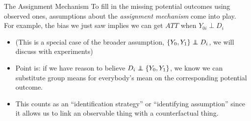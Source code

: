 \documentclass[xcolor=dvipsnames]{beamer}
\newcommand\indep{\protect\mathpalette{\protect\independenT}{\perp}}
\def\independenT#1#2{\mathrel{\rlap{$#1#2$}\mkern2mu{#1#2}}}
\begin{document}
\begin{frame}{The Assignment Mechanism}
\small
{} To fill in the missing potential outcomes using observed ones, assumptions about the \textit{assignment mechanism} come into play.  \\
\bigskip
{} For example, the bias we just saw implies we can get $ATT$ when $Y_{0i} \perp D_i$ 
\begin{itemize}
\footnotesize
\item (This is a special case of the broader assumption, $\{Y_0, Y_1 \} \indep D_i$, we will discuss with experiments)
\item Point is: if we have reason to believe $D_i \indep \{Y_0, Y_1 \}$, we know we can substitute group means for everybody's mean on the corresponding potential outcome.
\item This counts as an  ``identification strategy'' or ``identifying assumption'' since it allows us to link an observable thing with a counterfactual thing.
\end{itemize}
\end{frame}
\end{document}
